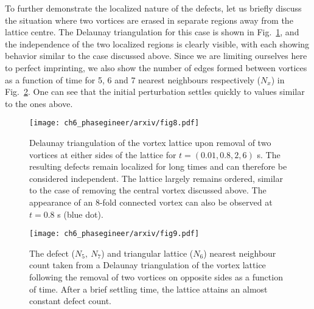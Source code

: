 To further demonstrate the localized nature of the defects, let us briefly discuss the situation where two vortices are erased in separate regions away from the lattice centre. The Delaunay triangulation for this case is shown in Fig.~\ref{fig:traj_2vtx_edge}, and the independence of the two localized regions is clearly visible, with each showing behavior similar to the case discussed above. Since we are limiting ourselves here to perfect imprinting, we also show the number of edges formed between vortices as a function of time for 5, 6 and 7 nearest neighbours respectively ($N_x$) in Fig.~\ref{fig:vtx_rem2_edge}. One can see that the initial perturbation settles quickly to values similar to the ones above.

\begin{figure}\centering
    \texttt{[image: ch6\_phasegineer/arxiv/fig8.pdf]}
    \caption{Delaunay triangulation of the vortex lattice upon removal of two vortices at either sides of the lattice for $t=(0.01,0.8,2,6)$ s. The resulting defects remain localized for long times and can therefore be considered independent. The lattice largely remains ordered, similar to the case of removing the central vortex discussed above. The appearance of an 8-fold connected vortex can also be observed at $t=0.8$ s (blue dot).}\label{fig:traj_2vtx_edge}
\end{figure}

\begin{figure}\centering
    \texttt{[image: ch6\_phasegineer/arxiv/fig9.pdf]}
    \caption{The defect ($N_5,~N_7$) and triangular lattice ($N_6$) nearest neighbour count taken from a Delaunay triangulation of the vortex lattice following the removal of two vortices on opposite sides as a function of time. After a brief settling time, the lattice attains an almost constant defect count.}
    \label{fig:vtx_rem2_edge}
\end{figure}


